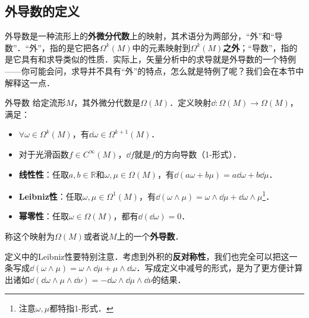 

\subsection{外导数的定义}

外导数是一种流形上的\textbf{外微分代数}上的映射，其术语分为两部分，“外”和“导数”．“外”，指的是它把各$\Omega^k(M)$中的元素映射到$\Omega^k(M)$\textbf{之外}；“导数”，指的是它具有和求导类似的性质．实际上，矢量分析中的求导就是外导数的一个特例——你可能会问，求导并不具有“外”的特点，怎么就是特例了呢？我们会在本节中解释这一点．

\begin{definition}{外导数}
给定流形$M$，其外微分代数是$\Omega (M)$．定义映射$\dd:\Omega (M)\rightarrow\Omega (M)$，满足：
\begin{itemize}
\item $\forall \omega\in\Omega^k(M)$，有$\dd \omega\in\Omega^{k+1}(M)$．
\item 对于光滑函数$f\in C^\infty(M)$，$\dd f$就是$f$的方向导数（1-形式）．
\item \textbf{线性性}：任取$a, b\in \mathbb{R}$和$\omega, \mu\in\Omega(M)$，有$\dd(a\omega+b\mu)=a\dd\omega+b\dd\mu$．
\item \textbf{Leibniz性}：任取$\omega, \mu\in\Omega^1(M)$，有$\dd(\omega\wedge\mu)=\omega\wedge\dd\mu+\dd\omega\wedge\mu$\footnote{注意$\omega, \mu$都特指1-形式．}．
\item \textbf{幂零性}：任取$\omega\in\Omega(M)$，都有$\dd(\dd\omega)=0$．
\end{itemize}
称这个映射为$\Omega (M)$或者说$M$上的一个\textbf{外导数}．
\end{definition}

定义中的Leibniz性要特别注意．考虑到外积的\textbf{反对称性}，我们也完全可以把这一条写成$\dd(\omega\wedge\mu)=\omega\wedge\dd\mu+\mu\wedge\dd\omega$．写成定义中减号的形式，是为了更方便计算出诸如$\dd(\dd\omega\wedge\mu\wedge\dd\nu)=-\dd\omega\wedge\dd\mu\wedge\dd\nu$的结果．





